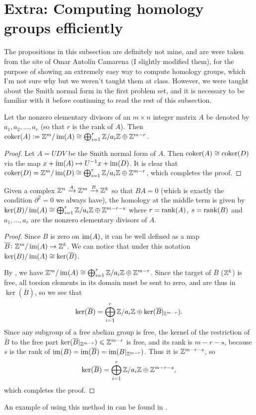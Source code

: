 \documentclass[11pt,a4paper]{article}
\begin{document}
\section{Extra: Computing homology groups efficiently}
\label{sec:computing-homology}
The propositions in this subsection are definitely not mine,
and are were taken from the site of Omar Antol\'in Camarena
(I slightly modified them), for the purpose of showing an extremely
easy way to compute homology groups, which I'm not sure why but we weren't
taught them at class.
However, we were taught about the Smith normal form in the first problem
set, and it is necessary to be familiar with it before continuing to read
the rest of this subsection.

\begin{proposition}
  \label{prop:snf-homology-lemma}
  Let the nonzero elementary divisors of an $m \times n$ integer
  matrix $A$ be denoted by $a_1,a_2,\dots,a_r$
  (so that $r$ is the rank of $A$).
  Then $\operatorname{coker}(A) :=
  \mathbb{Z}^m/\operatorname{im}(A) \cong \bigoplus_{i=1}^{r} \mathbb{Z}/a_i\mathbb{Z} \oplus \mathbb{Z}^{m-r}$.
\end{proposition}
\begin{proof}
  Let $A = UDV$ be the Smith normal form of $A$.
  Then $\operatorname{coker}(A) \cong \operatorname{coker}(D)$
  via the map $x + \operatorname{im}(A) \mapsto U^{-1} x + \operatorname{im}(D)$.
  It is clear that $\operatorname{coker}(D) =
  \mathbb{Z}^m/\operatorname{im}(D) \cong \bigoplus_{i=1}^{r} \mathbb{Z}/a_i\mathbb{Z} \oplus \mathbb{Z}^{m-r}$,
  which completes the proof.
\end{proof}

\begin{proposition}
  \label{prop:fast-homology}
  Given a complex $\mathbb{Z}^n \xrightarrow{A} \mathbb{Z}^m \xrightarrow{B} \mathbb{Z}^k$ so that $BA = 0$
  (which is exactly the condition $\partial^2 = 0$ we always have),
  the homology at the middle term is given by
  $\ker(B)/\operatorname{im}(A) \cong \bigoplus_{i=1}^{r} \mathbb{Z}/a_i\mathbb{Z} \oplus \mathbb{Z}^{m - r - s}$
  where $r = \operatorname{rank}(A)$, $s = \operatorname{rank}(B)$ and $a_1,\dots,a_r$ are the nonzero
  elementary divisors of $A$.
\end{proposition}
\begin{proof}
  Since $B$ is zero on $\operatorname{im}(A)$, it can be well defined as a map
  $\overline B \colon \mathbb{Z}^m / \operatorname{im}(A) \to \mathbb{Z}^k$.
  We can notice that
  under this notation $\ker(B)/\operatorname{im}(A) \cong \ker(\overline B)$.

  By ,
  we have $\mathbb{Z}^m/\operatorname{im}(A) \cong \bigoplus_{i=1}^{r} \mathbb{Z}/a_i\mathbb{Z} \oplus \mathbb{Z}^{m-r}$.
  Since the target of $\overline B$ ($\mathbb{Z}^k$) is free,
  all torsion elements in its domain must be sent to zero,
  and are thus in $\ker(\overline B)$, so we see that
  \[
    \ker(\overline B) =
    \bigoplus_{i=1}^{r} \mathbb{Z}/a_i\mathbb{Z} \oplus \ker(\overline B\vert_{\mathbb{Z}^{m-r}}).
  \]
  Since any subgroup of a free abelian group is free,
  the kernel of the restriction of $\overline B$ to the free part
  $\ker(\overline B\vert_{\mathbb{Z}^{m-r}}) \leqslant \mathbb{Z}^{m-r}$ is free,
  and its rank is $m - r - s$, because $s$ is the rank of
  $\operatorname{im}(B) = \operatorname{im}(\overline B) = \operatorname{im}(B\vert_{\mathbb{Z}^{m-r}})$.
  Thus it is $\mathbb{Z}^{m - r - s}$, so
  \[
    \ker(\overline B) =
    \bigoplus_{i=1}^{r} \mathbb{Z}/a_i\mathbb{Z} \oplus \mathbb{Z}^{m - r - s},
  \]
  which completes the proof.
\end{proof}

An example of using this method in can be found in .
\end{document}

